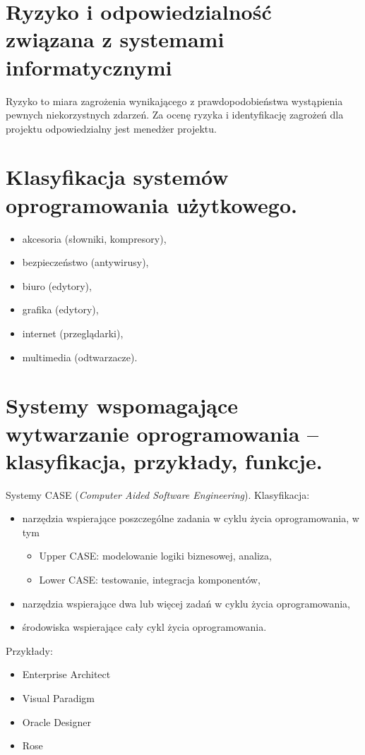 \documentclass[12pt,a4paper]{article}
\begin{document}
	\section{Ryzyko i odpowiedzialność związana z systemami informatycznymi}
	Ryzyko to miara zagrożenia wynikającego z prawdopodobieństwa wystąpienia pewnych niekorzystnych zdarzeń. Za ocenę ryzyka i identyfikację zagrożeń dla projektu odpowiedzialny jest menedżer projektu.

	\section{Klasyfikacja systemów oprogramowania użytkowego.}
	\begin{itemize}
		\item akcesoria (słowniki, kompresory),
		\item bezpieczeństwo (antywirusy),
		\item biuro (edytory),
		\item grafika (edytory),
		\item internet (przeglądarki),
		\item multimedia (odtwarzacze).
	\end{itemize}

	\section{Systemy wspomagające wytwarzanie oprogramowania – klasyfikacja, przykłady, funkcje.}
	Systemy CASE (\textit{Computer Aided Software Engineering}). Klasyfikacja:
	\begin{itemize}
		\item narzędzia wspierające poszczególne zadania w cyklu życia oprogramowania, w tym
		\begin{itemize}
			\item Upper CASE: modelowanie logiki biznesowej, analiza,
			\item Lower CASE: testowanie, integracja komponentów,
		\end{itemize}
		\item narzędzia wspierające dwa lub więcej zadań w cyklu życia oprogramowania,
		\item środowiska wspierające cały cykl życia oprogramowania.
	\end{itemize}
	
	Przykłady:
	\begin{itemize}
		\item Enterprise Architect
		\item Visual Paradigm
		\item Oracle Designer
		\item Rose
	\end{itemize}
\end{document}
